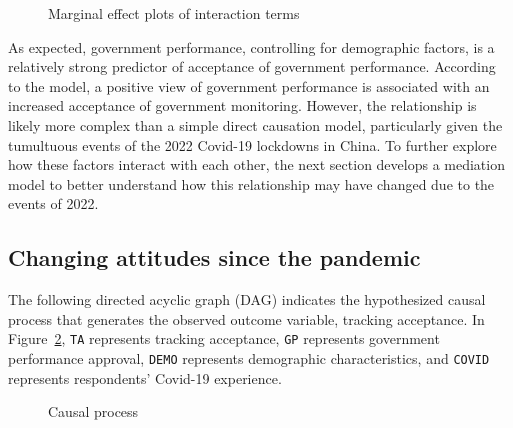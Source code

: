 \documentclass[
  letterpaper,
  DIV=11,
  numbers=noendperiod]{scrartcl}
\begin{document}
\begin{figure}
{{}


}

\caption{\label{fig-marginplotperform}Marginal effect plots of
interaction terms}

\end{figure}%

As expected, government performance, controlling for demographic
factors, is a relatively strong predictor of acceptance of government
performance. According to the model, a positive view of government
performance is associated with an increased acceptance of government
monitoring. However, the relationship is likely more complex than a
simple direct causation model, particularly given the tumultuous events
of the 2022 Covid-19 lockdowns in China. To further explore how these
factors interact with each other, the next section develops a mediation
model to better understand how this relationship may have changed due to
the events of 2022.

\subsection{Changing attitudes since the
pandemic}\label{changing-attitudes-since-the-pandemic}

The following directed acyclic graph (DAG) indicates the hypothesized
causal process that generates the observed outcome variable, tracking
acceptance. In Figure~\ref{fig-dag}, \texttt{TA} represents tracking
acceptance, \texttt{GP} represents government performance approval,
\texttt{DEMO} represents demographic characteristics, and \texttt{COVID}
represents respondents' Covid-19 experience.

\begin{figure}


\caption{\label{fig-dag}Causal process}

\end{figure}%
\end{document}
